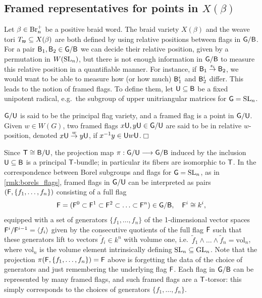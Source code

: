 \subsection{Framed representatives for points in $X(\beta)$}\label{ssec:framed_rep} Let $\beta\in\mbox{Br}_n^+$ be a positive braid word. The braid variety $X(\beta)$ and the weave tori $T_{\mathfrak{w}}\subseteq X(\beta)$ are both defined by using relative positions between flags in $\mathsf{G}/\mathsf{B}$. For a pair $\mathsf{B}_1,\mathsf{B}_2\in\mathsf{G}/\mathsf{B}$ we can decide their relative position, given by a permutation in $W(\operatorname{SL}_n)$, but there is not enough information in $\mathsf{G}/\mathsf{B}$ to measure this relative position in a quantifiable manner. For instance, if $\mathsf{B}_1\stackrel{s_i}{\to}\mathsf{B}_2$, we would want to be able to measure how (or how much) $\mathsf{B}^i_1$ and $\mathsf{B}^i_2$ differ. This leads to the notion of framed flags. To define them, let $\mathsf{U}\subseteq \mathsf{B}$ be a fixed unipotent radical, e.g.~the subgroup of upper unitriangular matrices for $\mathsf{G}=\operatorname{SL}_n$.

\begin{definition}
$\mathsf{G}/\mathsf{U}$ is said to be the principal flag variety, and a framed flag is a point in $\mathsf{G}/\mathsf{U}$. Given $w\in W(G)$, two framed flags $x\mathsf{U},y\mathsf{U}\in\mathsf{G}/\mathsf{U}$ are said to be in relative $w$-position, denoted $x\mathsf{U}\stackrel{w}{\to}y\mathsf{U}$, if $x^{-1}y\in \mathsf{U} w\mathsf{U}$.\hfill$\Box$
\end{definition}
Since $\mathsf{T}\cong\mathsf{B}/\mathsf{U}$, the projection map $\pi:\mathsf{G}/\mathsf{U}\longrightarrow\mathsf{G}/\mathsf{B}$ induced by the inclusion $\mathsf{U}\subseteq \mathsf{B}$ is a principal $\mathsf{T}$-bundle; in particular its fibers are isomorphic to $\mathsf{T}$. In the correspondence between Borel subgroups and flags for $\mathsf{G}=\operatorname{SL}_n$, as in \cref{rmk:borels_flags}, framed flags in $\mathsf{G}/\mathsf{U}$ can be interpreted as pairs $(\mathsf{F},\{f_1,\ldots,f_n\})$ consisting of a full flag
$$\mathsf{F}=(\mathsf{F}^0\subset \mathsf{F}^1\subset \mathsf{F}^2\subset\ldots \subset \mathsf{F}^n)\in\mathsf{G}/\mathsf{B},\quad \mathsf{F}^i\cong k^i,$$
equipped with a set of generators $\{f_1,\ldots,f_n\}$ of the 1-dimensional vector spaces $\mathsf{F}^i/\mathsf{F}^{i-1}=\langle f_i\rangle$ given by the consecutive quotients of the full flag $\mathsf{F}$ such that these generators lift to vectors $\tilde{f}_i\in k^n$ with volume one, i.e.~$\tilde{f}_1\wedge\ldots\wedge \tilde{f}_n=\mbox{vol}_n$, where $\mbox{vol}_n$ is the volume element intrinsically defining $\operatorname{SL}_n\subseteq\operatorname{GL}_n$. Note that the projection $\pi(\mathsf{F},\{f_1,\ldots,f_n\})=\mathsf{F}$ above is forgetting the data of the choice of generators and just remembering the underlying flag $\mathsf{F}$. Each flag in $\mathsf{G}/\mathsf{B}$ can be represented by many framed flags, and such framed flags are a $\mathsf{T}$-torsor: this simply corresponds to the choices of generators $\{f_1,\ldots,f_n\}$.

